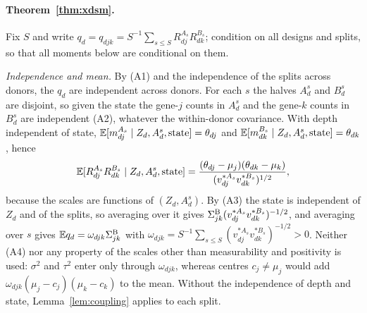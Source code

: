 \paragraph{Theorem~\ref{thm:xdsm}.} Fix $S$ and write $q_d=q_{djk}=S^{-1}\sum_{s\le S}R^{A_s}_{dj}R^{B_s}_{dk}$; condition on all designs and splits, so that all moments below are conditional on them.

\emph{Independence and mean.} By (A1) and the independence of the splits across donors, the $q_d$ are independent across donors. For each $s$ the halves $A^s_d$ and $B^s_d$ are disjoint, so given the state the gene-$j$ counts in $A^s_d$ and the gene-$k$ counts in $B^s_d$ are independent (A2), whatever the within-donor covariance. With depth independent of state, $\mathbb{E}[m^{A_s}_{dj}\mid Z_d,A^s_d,\text{state}]=\theta_{dj}$ and $\mathbb{E}[m^{B_s}_{dk}\mid Z_d,A^s_d,\text{state}]=\theta_{dk}$, hence
\[\mathbb{E}[R^{A_s}_{dj}R^{B_s}_{dk}\mid Z_d,A^s_d,\text{state}]=\frac{(\theta_{dj}-\mu_j)(\theta_{dk}-\mu_k)}{(v^{*A_s}_{dj}v^{*B_s}_{dk})^{1/2}},\]
because the scales are functions of $(Z_d,A^s_d)$. By (A3) the state is independent of $Z_d$ and of the splits, so averaging over it gives $\Sigma^{\mathrm{B}}_{jk}(v^{*A_s}_{dj}v^{*B_s}_{dk})^{-1/2}$, and averaging over $s$ gives $\mathbb{E} q_d=\omega_{djk}\Sigma^{\mathrm{B}}_{jk}$ with $\omega_{djk}=S^{-1}\sum_{s\le S}(v^{*A_s}_{dj}v^{*B_s}_{dk})^{-1/2}>0$. Neither (A4) nor any property of the scales other than measurability and positivity is used: $\sigma^2$ and $\tau^2$ enter only through $\omega_{djk}$, whereas centres $c_j\neq\mu_j$ would add $\omega_{djk}(\mu_j-c_j)(\mu_k-c_k)$ to the mean. Without the independence of depth and state, Lemma~\ref{lem:coupling} applies to each split.


